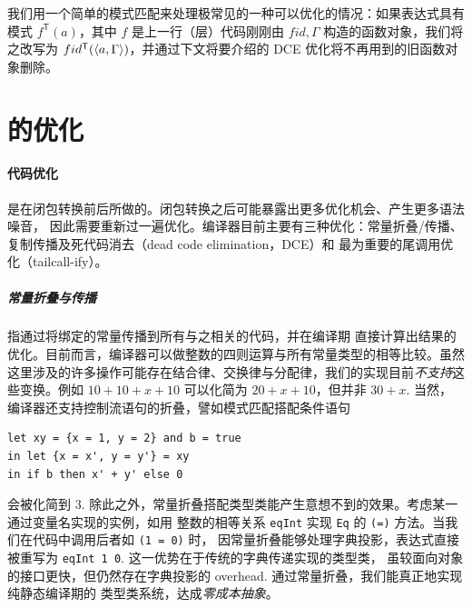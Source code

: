 \begin{remark}[优化：融合立即出现的尾调用]
  我们用一个简单的模式匹配来处理极常见的一种可以优化的情况：如果表达式具有模式 $f^\mathsf{T}(a)$，其中 $f$ 是上一行（层）代码刚刚由 $fid, \Gamma$ 构造的函数对象，我们将之改写为
  $fid^\mathsf{T}(\langle a, \Gamma \rangle)$，并通过下文将要介绍的 DCE 优化将不再用到的旧函数对象删除。
\end{remark}

\section{\Lambdair 的优化}

\paragraph{代码优化} 是在闭包转换前后所做的。闭包转换之后可能暴露出更多优化机会、产生更多语法噪音，
因此需要重新过一遍优化。\Tigris 编译器目前主要有三种优化：常量折叠/传播、复制传播及死代码消去（dead code elimination，DCE）和
最为重要的尾调用优化（tailcall-ify）。

{\setlength{\parskip}{-1em}\subparagraph{常量折叠与传播} 指通过将绑定的常量传播到所有与之相关的代码，并在编译期
  直接计算出结果的优化。目前而言，\Tigris 编译器可以做整数的四则运算与所有常量类型的相等比较。虽然
  这里涉及的许多操作可能存在结合律、交换律与分配律，我们的实现目前\emph{不支持}这些变换。例如 $10 + 10 + x + 10$
  可以化简为 $20 + x + 10$，但并非 $30 + x$. 当然，编译器还支持控制流语句的折叠，譬如模式匹配搭配条件语句
}
\begin{verbatim}
let xy = {x = 1, y = 2} and b = true
in let {x = x', y = y'} = xy 
in if b then x' + y' else 0
\end{verbatim}
\enlargethispage{.8cm}
会被化简到 $3$. 除此之外，常量折叠搭配类型类能产生意想不到的效果。考虑某一通过变量名实现的实例，如用
整数的相等关系 \texttt{eqInt} 实现 \texttt{Eq} 的 \texttt{(=)} 方法。当我们在代码中调用后者如 \texttt{(1 = 0)} 时，
因常量折叠能够处理字典投影，表达式直接被重写为 \texttt{eqInt 1 0}. 这一优势在于传统的字典传递实现的类型类，
虽较面向对象的接口更快，但仍然存在字典投影的 overhead. 通过常量折叠，我们能真正地实现纯静态编译期的
类型类系统，达成\emph{零成本抽象}。


